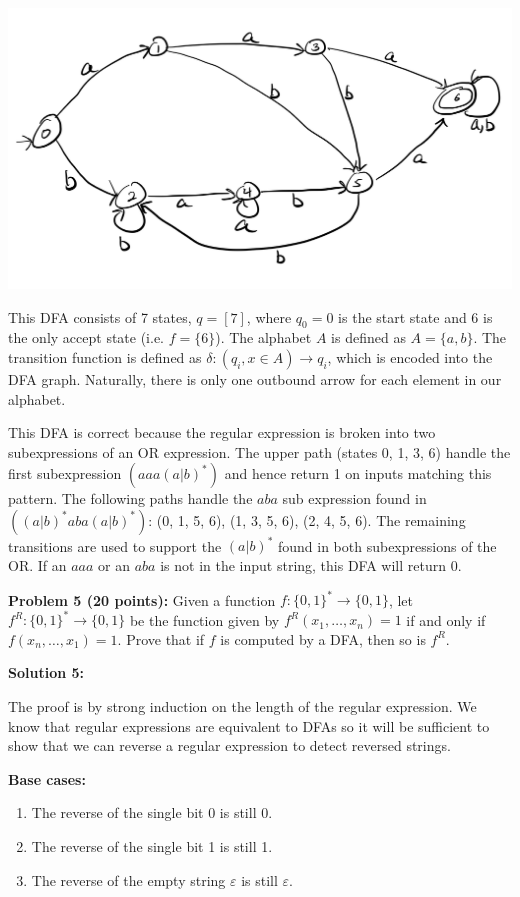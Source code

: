 \documentclass[11pt]{article}
\begin{document}
\includegraphics[scale=0.20]{problem_4.png}

This DFA consists of 7 states, $q=[7]$, where $q_0 = 0$ is the start state and 6 is the only accept state (i.e. $f=\{6\}$). The alphabet $A$ is defined as $A = \{a, b\}$. The transition function is defined as $\delta: (q_i, x \in A) \to q_i$, which is encoded into the DFA graph. Naturally, there is only one outbound arrow for each element in our alphabet.

This DFA is correct because the regular expression is broken into two subexpressions of an OR expression. The upper path (states 0, 1, 3, 6) handle the first subexpression $(aaa(a|b)^*)$ and hence return 1 on inputs matching this pattern. The following paths handle the $aba$ sub expression found in $\left((a|b)^*aba(a|b)^*\right)$: (0, 1, 5, 6), (1, 3, 5, 6), (2, 4, 5, 6). The remaining transitions are used to support the $(a|b)^*$ found in both subexpressions of the OR. If an $aaa$ or an $aba$ is not in the input string, this DFA will return 0. 

\newpage

\textbf{Problem 5 (20 points):} Given a function $f:\{0,1\}^* \to \{0,1\}$, let $f^R:\{0,1\}^* \to \{0,1\}$ be the function given by $f^R(x_1,\ldots,x_n) = 1$ if and only if $f(x_n,\ldots,x_1) = 1$.
Prove that if $f$ is computed by a DFA, then so is $f^R$. 


\textbf{Solution 5:}%

The proof is by strong induction on the length of the regular expression. We know that regular expressions are equivalent to DFAs so it will be sufficient to show that we can reverse a regular expression to detect reversed strings.

\textbf{Base cases:}
\begin{enumerate}
	\item The reverse of the single bit 0 is still 0.
	\item The reverse of the single bit 1 is still 1.
	\item The reverse of the empty string $\varepsilon$ is still $\varepsilon$.
  \end{enumerate}
\end{document}

